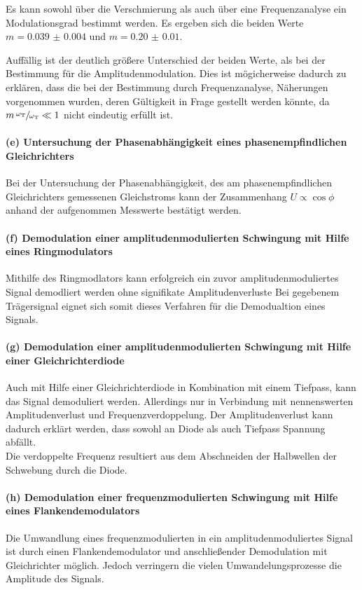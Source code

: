 Es kann sowohl über
die Verschmierung als auch über eine Frequenzanalyse
ein Modulationsgrad bestimmt werden.
Es ergeben sich die beiden Werte
$m = \num{0.039(4)}$ und
$m=\num{0.20(1)}$.

Auffällig ist der deutlich größere Unterschied der beiden Werte,
als bei der Bestimmung für die Amplitudenmodulation.
Dies ist mögicherweise dadurch zu erklären, dass
die bei der Bestimmung durch Frequenzanalyse, Näherungen vorgenommen
wurden, deren Gültigkeit in Frage gestellt werden könnte, da
$m \, \sfrac{\omega_{\text{T}}}{\omega_{\text{T}}}\ll1$
nicht eindeutig erfüllt ist.

\paragraph{(e) Untersuchung der Phasenabhängigkeit eines
phasenempfindlichen Gleichrichters}
Bei der Untersuchung der Phasenabhängigkeit, des am phasenempfindlichen
Gleichrichters gemessenen Gleichstroms kann der Zusammenhang $U \propto \cos \phi$ anhand der
aufgenommen Messwerte bestätigt werden.


\paragraph{(f) Demodulation einer amplitudenmodulierten Schwingung
mit Hilfe eines Ringmodulators}
Mithilfe des Ringmodlators kann erfolgreich
ein zuvor amplitudenmoduliertes Signal
demodliert werden ohne signifikate Amplitudenverluste
Bei gegebenem Trägersignal eignet sich somit dieses Verfahren für die
Demodualtion eines Signals.

\paragraph{(g) Demodulation einer amplitudenmodulierten Schwingung
mit Hilfe einer Gleichrichterdiode}
Auch mit Hilfe einer Gleichrichterdiode in Kombination mit einem
Tiefpass, kann das Signal demoduliert werden.
Allerdings nur in Verbindung mit nennenswerten
Amplitudenverlust und Frequenzverdoppelung.
Der Amplitudenverlust kann dadurch erklärt werden, dass sowohl
an Diode als auch Tiefpass Spannung abfällt.\\
Die verdoppelte Frequenz resultiert aus dem Abschneiden
der Halbwellen der Schwebung durch die Diode.
\paragraph{(h) Demodulation einer frequenzmodulierten Schwingung
 mit Hilfe eines Flankendemodulators}
Die Umwandlung eines frequenzmodulierten in ein
amplitudenmoduliertes Signal ist durch einen Flankendemodulator
und anschließender Demodulation mit Gleichrichter
möglich. Jedoch verringern die
vielen Umwandelungsprozesse die Amplitude des Signals.
